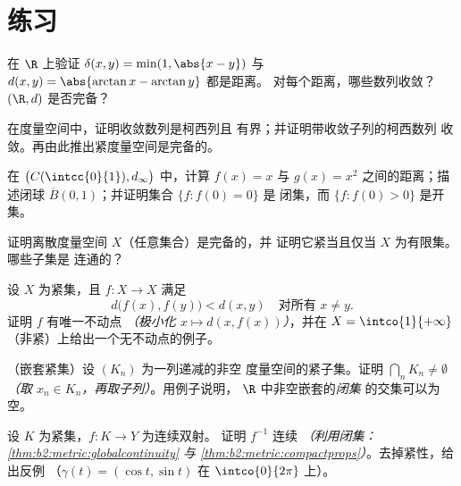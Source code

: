 \section{练习}

\begin{exercise}[$\star$]\label{exo:b2:metric:1}
在 $\R$ 上验证 $\delta(x, y) = \min(1, \abs{x - y})$ 与
$d(x,y) = \abs{\arctan x - \arctan y}$ 都是距离。
对每个距离，哪些数列收敛？$(\R, d)$ 是否完备？
\end{exercise}

\begin{exercise}[$\star$]\label{exo:b2:metric:2}
在度量空间中，证明收敛数列是柯西列且
有界；并证明带收敛子列的柯西数列
收敛。再由此推出紧度量空间是完备的。
\end{exercise}

\begin{exercise}[$\star$]\label{exo:b2:metric:3}
在 $\bigl(C(\intcc{0}{1}), d_\infty\bigr)$ 中，计算
$f(x) = x$ 与 $g(x) = x^2$ 之间的距离；描述闭球
$\overline B(0, 1)$；并证明集合 $\{f : f(0) = 0\}$ 是
闭集，而 $\{f : f(0) > 0\}$ 是开集。
\end{exercise}

\begin{exercise}[$\star\star$]\label{exo:b2:metric:4}
证明离散度量空间 $X$（任意集合）是完备的，并
证明它紧当且仅当 $X$ 为有限集。哪些子集是
连通的？
\end{exercise}

\begin{exercise}[$\star\star$]\label{exo:b2:metric:5}
设 $X$ 为紧集，且 $f \colon X \to X$ 满足
\[
d\bigl(f(x), f(y)\bigr) < d(x, y) \quad \text{对所有 } x \neq y .
\]
证明 $f$ 有唯一不动点 \emph{（极小化 $x \mapsto
d(x, f(x))$）}，并在 $X = \intco{1}{+\infty}$
（非紧）上给出一个无不动点的例子。
\end{exercise}

\begin{exercise}[$\star\star$]\label{exo:b2:metric:6}
（嵌套紧集）设 $(K_n)$ 为一列递减的非空
度量空间的紧子集。证明 $\bigcap_n K_n \neq
\emptyset$ \emph{（取 $x_n \in K_n$，再取子列）}。用例子说明，
$\R$ 中非空嵌套的\emph{闭集}
的交集可以为空。
\end{exercise}

\begin{exercise}[$\star\star$]\label{exo:b2:metric:7}
设 $K$ 为紧集，$f \colon K \to Y$ 为连续双射。
证明 $f^{-1}$ 连续 \emph{（利用闭集：
\cref{thm:b2:metric:globalcontinuity} 与
\cref{thm:b2:metric:compactprops}）}。去掉紧性，给出反例
（$\gamma(t) = (\cos t, \sin t)$ 在
$\intco{0}{2\pi}$ 上）。
\end{exercise}

